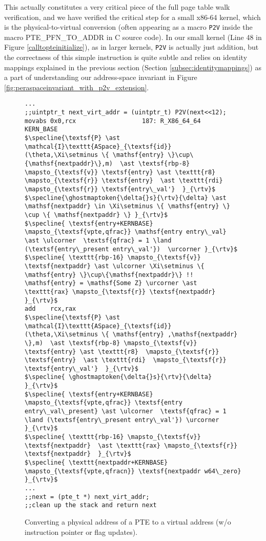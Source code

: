 This actually constitutes a very critical piece of the full page table walk verification, and we have verified the critical step for a small x86-64 kernel, which is the physical-to-virtual conversion (often appearing as a macro \texttt{P2V} inside the macro \textsf{ PTE\_PFN\_TO\_ADDR} in C source code). In our small kernel (Line 48 in Figure \ref{calltopteinitialize}), as in larger kernels, \texttt{P2V} is actually just addition, but the correctness of this simple instruction is quite subtle and relies on identity mappings explained in the previous section (Section \ref{subsec:identitymappings}) as a part of understanding our address-space invariant in Figure \ref{fig:peraspaceinvariant_with_p2v_extension}.
\begin{figure}\footnotesize
\begin{lstlisting}[mathescape]
...
;;uintptr_t next_virt_addr = (uintptr_t) P2V(next<<12);
movabs 0x0,rcx	                187: R_X86_64_64	KERN_BASE
$\specline{\textsf{P} \ast \mathcal{I}\texttt{ASpace}_{\textsf{id}}(\theta,\Xi\setminus \{ \mathsf{entry} \}\cup\{\mathsf{nextpaddr}\},m)  \ast \textsf{rbp-8} \mapsto_{\textsf{v}} \textsf{entry} \ast \texttt{r8}  \mapsto_{\textsf{r}} \textsf{entry}  \ast \texttt{rdi}  \mapsto_{\textsf{r}} \textsf{entry\_val'}  }_{\rtv}$
$\specline{\ghostmaptoken{\delta{}s}{\rtv}{\delta} \ast \mathsf{nextpaddr} \in \Xi\setminus \{ \mathsf{entry} \} \cup \{ \mathsf{nextpaddr} \} }_{\rtv}$
$\specline{ \textsf{entry+KERNBASE} \mapsto_{\textsf{vpte,qfrac}} \mathsf{entry entry\_val} \ast \ulcorner  \textsf{qfrac} = 1 \land (\textsf{entry\_present entry\_val'})  \urcorner }_{\rtv}$
$\specline{ \texttt{rbp-16} \mapsto_{\textsf{v}} \textsf{nextpaddr} \ast \ulcorner \Xi\setminus \{ \mathsf{entry} \}\cup\{\mathsf{nextpaddr}\} !! \mathsf{entry} = \mathsf{Some Z} \urcorner \ast \texttt{rax} \mapsto_{\textsf{r}} \textsf{nextpaddr}  }_{\rtv}$
add    rcx,rax
$\specline{\textsf{P} \ast \mathcal{I}\texttt{ASpace}_{\textsf{id}}(\theta,\Xi\setminus \{ \mathsf{entry} ,\mathsf{nextpaddr} \},m)  \ast \textsf{rbp-8} \mapsto_{\textsf{v}} \textsf{entry} \ast \texttt{r8}  \mapsto_{\textsf{r}} \textsf{entry}  \ast \texttt{rdi}  \mapsto_{\textsf{r}} \textsf{entry\_val'}  }_{\rtv}$
$\specline{ \ghostmaptoken{\delta{}s}{\rtv}{\delta}  }_{\rtv}$
$\specline{ \textsf{entry+KERNBASE} \mapsto_{\textsf{vpte,qfrac}} \textsf{entry entry\_val\_present} \ast \ulcorner  \textsf{qfrac} = 1 \land (\textsf{entry\_present entry\_val'}) \urcorner }_{\rtv}$
$\specline{ \texttt{rbp-16} \mapsto_{\textsf{v}} \textsf{nextpaddr}  \ast \texttt{rax} \mapsto_{\textsf{r}} \textsf{nextpaddr}  }_{\rtv}$
$\specline{ \texttt{nextpaddr+KERNBASE} \mapsto_{\textsf{vpte,qfracn}} \textsf{nextpaddr w64\_zero} }_{\rtv}$
...
;;next = (pte_t *) next_virt_addr;
;;clean up the stack and return next
\end{lstlisting}
\vspace{-1em}
\caption{Converting a physical address of a PTE to a virtual address (w/o instruction pointer or flag updates).}
\label{fig:p2v}
\end{figure}
